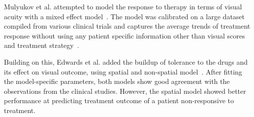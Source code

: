 \documentclass[12pt,a4paper]{journal}
\begin{document}
Mulyukov et al. attempted to model the response to therapy in terms of visual acuity with a mixed effect model~\cite{Mulyukov_2018}.
The model was calibrated on a large dataset compiled from various clinical trials and captures the average trends of treatment response without using any patient specific information other than visual scores and treatment strategy~\cite{Mulyukov_2018}.

Building on this, Edwards et al. added the buildup of tolerance to the drugs and its effect on visual outcome, using spatial and non-spatial model~\cite{Edwards_2020}.
After fitting the model-specific parameters, both models show good agreement with the observations from the clinical studies.
However, the spatial model showed better performance at predicting treatment outcome of a patient non-responsive to treatment.



\end{document}
